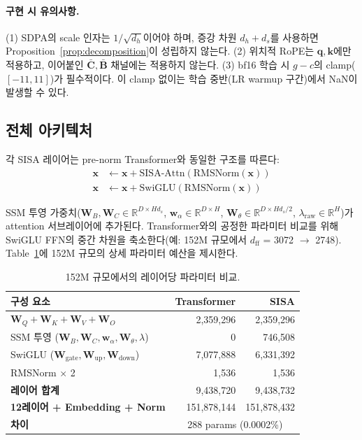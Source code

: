 \documentclass[11pt]{article}
\begin{document}
\paragraph{구현 시 유의사항.}
(1) SDPA의 scale 인자는 $1/\sqrt{d_h}$이어야 하며, 증강 차원 $d_h + d_s$를 사용하면 Proposition~\ref{prop:decomposition}이 성립하지 않는다.
(2) 위치적 RoPE는 $\mathbf{q}, \mathbf{k}$에만 적용하고, 이어붙인 $\bar{\mathbf{C}}, \bar{\mathbf{B}}$ 채널에는 적용하지 않는다.
(3) bf16 학습 시 $g - c$의 clamp($[-11, 11]$)가 필수적이다. 이 clamp 없이는 학습 중반(LR warmup 구간)에서 NaN이 발생할 수 있다.

\subsection{전체 아키텍처}

각 SISA 레이어는 pre-norm Transformer와 동일한 구조를 따른다:
\begin{align}
\mathbf{x} &\leftarrow \mathbf{x} + \text{SISA-Attn}(\text{RMSNorm}(\mathbf{x})) \\
\mathbf{x} &\leftarrow \mathbf{x} + \text{SwiGLU}(\text{RMSNorm}(\mathbf{x}))
\end{align}

SSM 투영 가중치($\mathbf{W}_B, \mathbf{W}_C \in \mathbb{R}^{D \times Hd_s}$, $\mathbf{w}_\alpha \in \mathbb{R}^{D \times H}$, $\mathbf{W}_\theta \in \mathbb{R}^{D \times Hd_s/2}$, $\lambda_{\text{raw}} \in \mathbb{R}^H$)가 attention 서브레이어에 추가된다. Transformer와의 공정한 파라미터 비교를 위해 SwiGLU FFN의 중간 차원을 축소한다(예: 152M 규모에서 $d_{\text{ff}}$ = 3072 $\to$ 2748). Table~\ref{tab:param_budget}에 152M 규모의 상세 파라미터 예산을 제시한다.

\begin{table}[h]
\centering
\small
\caption{152M 규모에서의 레이어당 파라미터 비교.}
\label{tab:param_budget}
\begin{tabular}{lrr}
\toprule
\textbf{구성 요소} & \textbf{Transformer} & \textbf{SISA} \\
\midrule
$\mathbf{W}_Q + \mathbf{W}_K + \mathbf{W}_V + \mathbf{W}_O$ & 2,359,296 & 2,359,296 \\
SSM 투영 ($\mathbf{W}_B, \mathbf{W}_C, \mathbf{w}_\alpha, \mathbf{W}_\theta, \lambda$) & 0 & 746,508 \\
SwiGLU ($\mathbf{W}_{\text{gate}}, \mathbf{W}_{\text{up}}, \mathbf{W}_{\text{down}}$) & 7,077,888 & 6,331,392 \\
RMSNorm $\times$ 2 & 1,536 & 1,536 \\
\midrule
\textbf{레이어 합계} & 9,438,720 & 9,438,732 \\
\textbf{12레이어 + Embedding + Norm} & 151,878,144 & 151,878,432 \\
\textbf{차이} & \multicolumn{2}{c}{288 params (0.0002\%)} \\
\bottomrule
\end{tabular}
\end{table}
\end{document}
